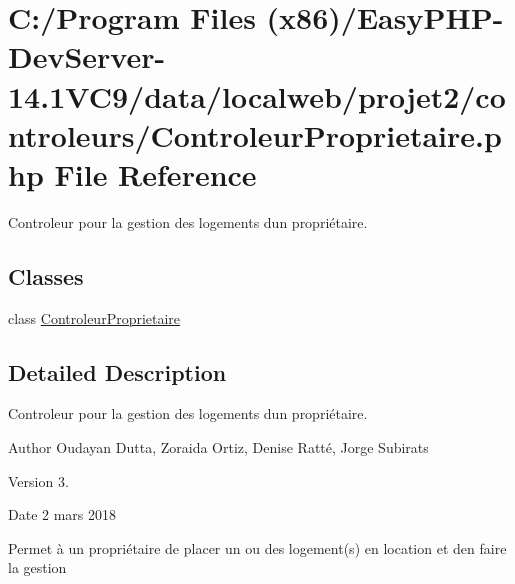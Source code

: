 \hypertarget{_controleur_proprietaire_8php}{}\section{C\+:/\+Program Files (x86)/\+Easy\+P\+H\+P-\/\+Dev\+Server-\/14.1\+V\+C9/data/localweb/projet2/controleurs/\+Controleur\+Proprietaire.php File Reference}
\label{_controleur_proprietaire_8php}


Controleur pour la gestion des logements d\textquotesingle{}un propriétaire.  


\subsection*{Classes}
\begin{DoxyCompactItemize}
\item 
class \hyperlink{class_controleur_proprietaire}{Controleur\+Proprietaire}
\end{DoxyCompactItemize}


\subsection{Detailed Description}
Controleur pour la gestion des logements d\textquotesingle{}un propriétaire. 

\begin{DoxyAuthor}{Author}
Oudayan Dutta, Zoraida Ortiz, Denise Ratté, Jorge Subirats 
\end{DoxyAuthor}
\begin{DoxyVersion}{Version}
3. 
\end{DoxyVersion}
\begin{DoxyDate}{Date}
2 mars 2018
\end{DoxyDate}
Permet à un propriétaire de placer un ou des logement(s) en location et d\textquotesingle{}en faire la gestion 